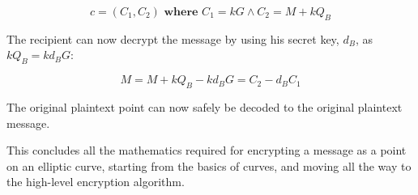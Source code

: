 \begin{equation}
	c = (C_1, C_2)  \textbf{ where }  C_1 = kG \land C_2 = M+kQ_B
\end{equation}

The recipient can now decrypt the message by using his secret key, \(d_B\), as \(kQ_B = kd_BG\):

\begin{equation}
	M = M + k Q_B - k d_B G = C_2 - d_B C_1
\end{equation}

The original plaintext point can now safely be decoded to the original plaintext message.\cite{hankerson2010}

This concludes all the mathematics required for encrypting a message as a point on an elliptic curve, starting from
the basics of curves, and moving all the way to the high-level encryption algorithm.